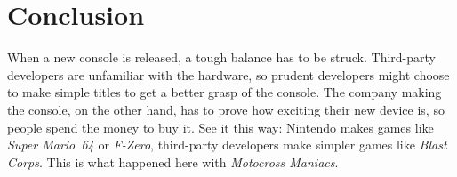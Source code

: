 \documentclass{book}
\begin{document}
\FloatBarrier\needspace{10mm}\section*{Conclusion}\nopagebreak[4]

When a new console is released, a tough balance has to be struck. Third-party developers are unfamiliar with the hardware, so prudent developers might choose to make simple titles to get a better grasp of the console. The company making the console, on the other hand, has to prove how exciting their new device is, so people spend the money to buy it. See it this way: Nintendo makes games like \emph{Super Mario~64} or \emph{F-Zero}, third-party developers make simpler games like \emph{Blast Corps}. This is what happened here with \emph{Motocross Maniacs}.
\end{document}
